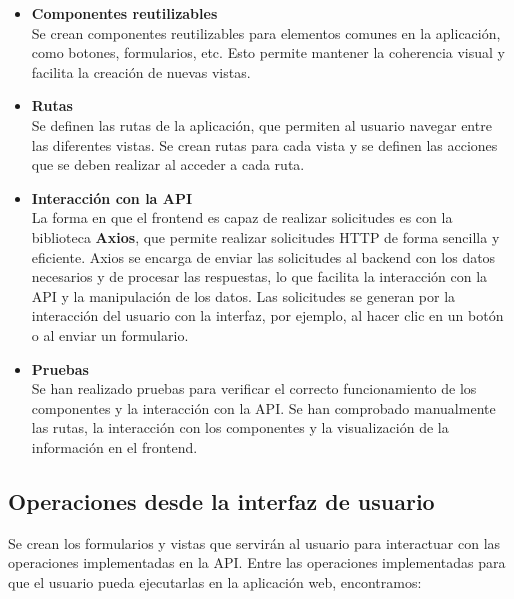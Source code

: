\begin{itemize}
    \item \textbf{Componentes reutilizables}\\
        Se crean componentes reutilizables para elementos comunes en la aplicación, como botones, formularios, etc. Esto permite mantener la coherencia visual y facilita la creación de nuevas vistas.
    \item \textbf{Rutas}\\
        Se definen las rutas de la aplicación, que permiten al usuario navegar entre las diferentes vistas. Se crean rutas para cada vista y se definen las acciones que se deben realizar al acceder a cada ruta.
    \item \textbf{Interacción con la API}\\
        La forma en que el frontend es capaz de realizar solicitudes es con la biblioteca \textbf{Axios}, que permite realizar solicitudes HTTP de forma sencilla y eficiente. Axios se encarga de enviar las solicitudes al backend con los datos necesarios y de procesar las respuestas, lo que facilita la interacción con la API y la manipulación de los datos. Las solicitudes se generan por la interacción del usuario con la interfaz, por ejemplo, al hacer clic en un botón o al enviar un formulario.
    \item \textbf{Pruebas}\\
        Se han realizado pruebas para verificar el correcto funcionamiento de los componentes y la interacción con la API. Se han comprobado manualmente las rutas, la interacción con los componentes y la visualización de la información en el frontend.
\end{itemize}


\subsection{Operaciones desde la interfaz de usuario}
Se crean los formularios y vistas que servirán al usuario para interactuar con las operaciones implementadas en la API. Entre las operaciones implementadas para que el usuario pueda ejecutarlas en la aplicación web, encontramos:

